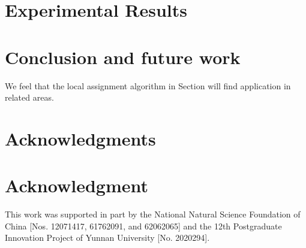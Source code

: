 \documentclass[journal]{IEEEtran}
\begin{document}
\section{Experimental Results}

\section{Conclusion and future work}
We feel that the local assignment algorithm in Section will find
application in related areas.
\ifCLASSOPTIONcompsoc
\section*{Acknowledgments}
\else
\section*{Acknowledgment}
\fi

This work was supported in part by the National Natural
Science Foundation of China [Nos. 12071417, 61762091, and
62062065] and the 12th Postgraduate Innovation Project of
Yunnan University [No. 2020294].



\ifCLASSOPTIONcaptionsoff
\newpage
\fi




\ifCLASSOPTIONcaptionsoff
  \newpage
\fi





%
%
%


\end{document}
